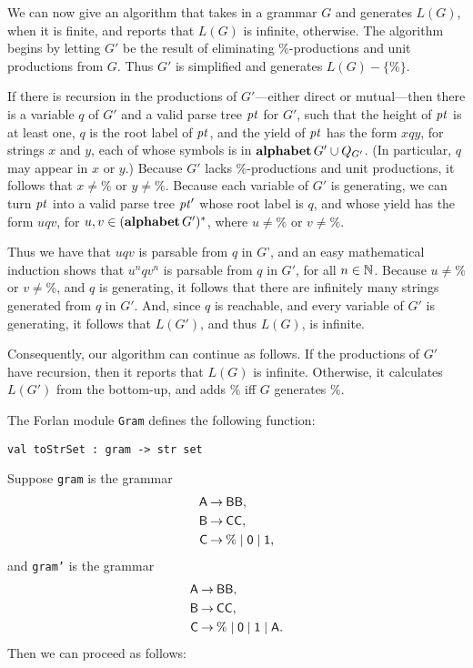 %
We can now give an algorithm that takes in a grammar $G$ and generates
$L(G)$, when it is finite, and reports that $L(G)$ is infinite,
otherwise. The algorithm begins by letting $G'$ be the result of
eliminating $\%$-productions and unit productions from $G$. Thus $G'$
is simplified and generates $L(G)-\{\%\}$.

If there is recursion in the productions of $G'$---either direct or
mutual---then there is a variable $q$ of $G'$ and a valid parse tree
${\it pt}$ for $G'$, such that the height of ${\it pt}$ is at least one, $q$ is
the root label of ${\it pt}$, and the yield of ${\it pt}$ has the form $xqy$,
for strings $x$ and $y$, each of whose symbols is in
$\mathbf{alphabet}\,G'\cup Q_{G'}$. (In particular, $q$ may appear in $x$ or
$y$.) Because $G'$ lacks $\%$-productions and unit productions, it
follows that $x\neq\%$ or $y\neq\%$. Because each variable of $G'$ is
generating, we can turn ${\it pt}$ into a valid parse tree ${\it pt}'$ whose
root label is $q$, and whose yield has the form $uqv$, for
$u,v\in(\mathbf{alphabet}\,G')^*$, where $u\neq\%$ or $v\neq\%$.

Thus we have that $uqv$ is parsable from $q$ in $G$', and an easy
mathematical induction shows that $u^nqv^n$ is parsable from $q$ in
$G'$, for all $n\in\mathbb{N}$.  Because $u\neq\%$ or $v\neq\%$, and $q$ is
generating, it follows that there are infinitely many strings
generated from $q$ in $G'$. And, since $q$ is reachable, and every
variable of $G'$ is generating, it follows that $L(G')$, and thus
$L(G)$, is infinite.

Consequently, our algorithm can continue as follows. If the
productions of $G'$ have recursion, then it reports that $L(G)$ is
infinite.  Otherwise, it calculates $L(G')$ from the bottom-up, and
adds $\%$ iff $G$ generates $\%$.

The Forlan module \texttt{Gram} defines the following function:
\begin{verbatim}
val toStrSet : gram -> str set
\end{verbatim}
%
Suppose \texttt{gram} is the grammar
\begin{align*}
\mathsf{A} &\mathbin{\to} \mathsf{BB}, \\
\mathsf{B} &\mathbin{\to} \mathsf{CC}, \\
\mathsf{C} &\mathbin{\to} \% \mid \mathsf{0} \mid \mathsf{1} ,
\end{align*}
and
\texttt{gram'} is the grammar
\begin{align*}
\mathsf{A} &\mathbin{\to} \mathsf{BB}, \\
\mathsf{B} &\mathbin{\to} \mathsf{CC}, \\
\mathsf{C} &\mathbin{\to} \% \mid \mathsf{0} \mid \mathsf{1} \mid \mathsf{A} .
\end{align*}
Then we can proceed as follows:
  

